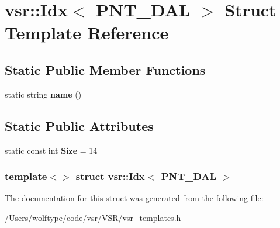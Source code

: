 \hypertarget{structvsr_1_1_idx_3_01_p_n_t___d_a_l_01_4}{\section{vsr\-:\-:Idx$<$ P\-N\-T\-\_\-\-D\-A\-L $>$ Struct Template Reference}
\label{structvsr_1_1_idx_3_01_p_n_t___d_a_l_01_4}
}
\subsection*{Static Public Member Functions}
\begin{DoxyCompactItemize}
\item 
\hypertarget{structvsr_1_1_idx_3_01_p_n_t___d_a_l_01_4_a19f4a75138ef586f757fd115c057d3c0}{static string {\bfseries name} ()}\label{structvsr_1_1_idx_3_01_p_n_t___d_a_l_01_4_a19f4a75138ef586f757fd115c057d3c0}

\end{DoxyCompactItemize}
\subsection*{Static Public Attributes}
\begin{DoxyCompactItemize}
\item 
\hypertarget{structvsr_1_1_idx_3_01_p_n_t___d_a_l_01_4_ad2aa59dfa3b4bd1fadb1701a4e19ceae}{static const int {\bfseries Size} = 14}\label{structvsr_1_1_idx_3_01_p_n_t___d_a_l_01_4_ad2aa59dfa3b4bd1fadb1701a4e19ceae}

\end{DoxyCompactItemize}
\subsubsection*{template$<$$>$ struct vsr\-::\-Idx$<$ P\-N\-T\-\_\-\-D\-A\-L $>$}



The documentation for this struct was generated from the following file\-:\begin{DoxyCompactItemize}
\item 
/\-Users/wolftype/code/vsr/\-V\-S\-R/vsr\-\_\-templates.\-h\end{DoxyCompactItemize}
